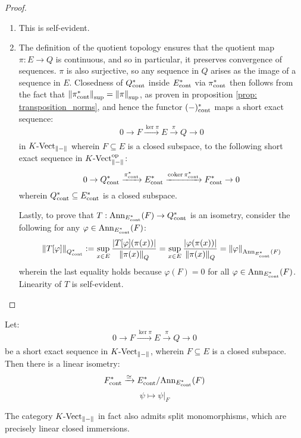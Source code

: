             \begin{proof}
                \begin{enumerate}
                    \item This is self-evident.
                    \item The definition of the quotient topology ensures that the quotient map $\pi: E \to Q$ is continuous, and so in particular, it preserves convergence of sequences. $\pi$ is also surjective, so any sequence in $Q$ arises as the image of a sequence in $E$. Closedness of $Q^*_{\mathrm{cont}}$ inside $E_{\mathrm{cont}}^*$ via $\pi_{\mathrm{cont}}^*$ then follows from the fact that $\left\| {\pi^*_{\mathrm{cont}}} \right\|_{\sup} = \left\| {\pi} \right\|_{\sup}$, as proven in proposition \ref{prop: transposition_norms}, and hence the functor $(-)^*_{\mathrm{cont}}$ maps a short exact sequence:
                        $$0 \to F \xrightarrow[]{\ker \pi} E \xrightarrow[]{\pi} Q \to 0$$
                    in $K\text{-}\mathrm{Vect}_{\left\| {-} \right\|}$ wherein $F \subseteq E$ is a closed subspace, to the following short exact sequence in $K\text{-}\mathrm{Vect}_{\left\| {-} \right\|}^{\mathrm{op}}$:
                        $$0 \to Q^*_{\mathrm{cont}} \xrightarrow[]{\pi^*_{\mathrm{cont}}} E^*_{\mathrm{cont}} \xrightarrow[]{\operatorname{coker} \pi^*_{\mathrm{cont}}} F^*_{\mathrm{cont}} \to 0$$
                    wherein $Q^*_{\mathrm{cont}} \subseteq E^*_{\mathrm{cont}}$ is a closed subspace.

                    Lastly, to prove that $T: \mathrm{Ann}_{E^*_{\mathrm{cont}}}(F) \to Q^*_{\mathrm{cont}}$ is an isometry, consider the following for any $\varphi \in \mathrm{Ann}_{E^*_{\mathrm{cont}}}(F)$:
                        $$\left\| {T[\varphi]} \right\|_{Q^*_{\mathrm{cont}}} := \sup_{x \in E} \frac{ \left\lvert {T[\varphi]( \pi(x) )} \right\rvert }{ \left\| {\pi(x)} \right\|_Q } = \sup_{x \in E} \frac{ \left\lvert {\varphi(\pi(x))} \right\rvert }{ \left\| {\pi(x)} \right\|_Q } = \left\| {\varphi} \right\|_{\mathrm{Ann}_{E^*_{\mathrm{cont}}}(F)}$$
                    wherein the last equality holds because $\varphi(F) = 0$ for all $\varphi \in \mathrm{Ann}_{E^*_{\mathrm{cont}}}(F)$. Linearity of $T$ is self-evident.
                \end{enumerate}
            \end{proof}
        \begin{corollary}
            Let:
                $$0 \to F \xrightarrow[]{\ker \pi} E \xrightarrow[]{\pi} Q \to 0$$
            be a short exact sequence in $K\text{-}\mathrm{Vect}_{\left\| {-} \right\|}$, wherein $F \subseteq E$ is a closed subspace. Then there is a linear isometry:
                $$F^*_{\mathrm{cont}} \xrightarrow[]{\simeq} E^*_{\mathrm{cont}}/\mathrm{Ann}_{E^*_{\mathrm{cont}}}(F)$$
                $$\psi \mapsto \psi|_F$$
        \end{corollary}
        \begin{proposition} \label{prop: split_monomorphisms_of_normed_spaces}
            The category $K\text{-}\mathrm{Vect}_{\left\| {-} \right\|}$ in fact also admits split monomorphisms, which are precisely linear closed immersions.
        \end{proposition}
